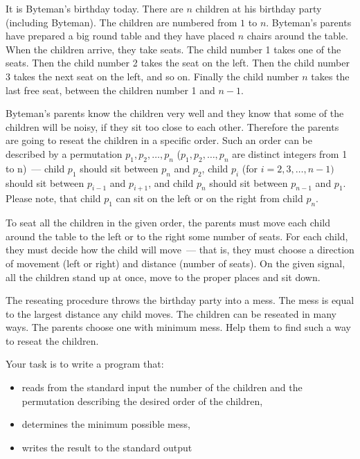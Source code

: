 It is Byteman's birthday today. There are $n$ children at his birthday party (including Byteman). The children
are numbered from $1$ to $n$. Byteman's parents have prepared a big round table and they have placed $n$ chairs
around the table. When the children arrive, they take seats. The child number 1 takes one of the seats. Then
the child number 2 takes the seat on the left. Then the child number 3 takes the next seat on the left, and so
on. Finally the child number $n$ takes the last free seat, between the children number 1 and $n - 1$.

Byteman's parents know the children very well and they know that some of the children will be noisy, if
they sit too close to each other. Therefore the parents are going to reseat the children in a specific order. Such
an order can be described by a permutation $p_1, p_2, \ldots , p_n$ ($p_1, p_2, \ldots, p_n$ are distinct integers from 1 to n)~---
child $p_1$ should sit between $p_n$ and $p_2$, child $p_i$ (for $i = 2,3, \ldots , n-1)$ should sit between $p_{i - 1}$ and $p_{i + 1}$, and
child $p_n$ should sit between $p_{n - 1}$ and $p_1$. Please note, that child $p_1$ can sit on the left or on the right from child $p_n$.

To seat all the children in the given order, the parents must move each child around the table to the left or
to the right some number of seats. For each child, they must decide how the child will move~--- that is, they
must choose a direction of movement (left or right) and distance (number of seats). On the given signal, all
the children stand up at once, move to the proper places and sit down.

The reseating procedure throws the birthday party into a mess. The mess is equal to the largest distance
any child moves. The children can be reseated in many ways. The parents choose one with minimum mess.
Help them to find such a way to reseat the children.

Your task is to write a program that:

\begin{itemize}
\item reads from the standard input the number of the children and the permutation describing the desired
order of the children,

\item determines the minimum possible mess,

\item writes the result to the standard output
\end{itemize}